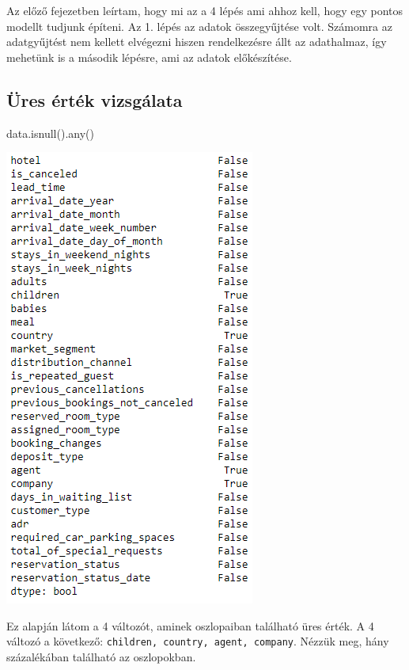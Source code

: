 
Az előző fejezetben leírtam, hogy mi az a 4 lépés ami ahhoz kell, hogy egy pontos modellt tudjunk építeni. Az 1. lépés az adatok összegyűjtése volt. Számomra az adatgyűjtést nem kellett elvégezni hiszen rendelkezésre állt az adathalmaz, így mehetünk is a második lépésre, ami az adatok előkészítése.

\subsection{Üres érték vizsgálata}
\begin{python}
data.isnull().any()
\end{python}
\includegraphics[scale=0.7]{images/4.fejezet/1.adatelokeszites.PNG}

Ez alapján látom a 4 változót, aminek oszlopaiban található üres érték. A 4 változó a következő: \texttt{children, country, agent, company}. Nézzük meg, hány százalékában található az oszlopokban.

